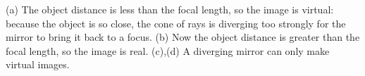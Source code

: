 (a) The object distance is less than the focal length, so the
image is virtual: because the object is so close, the cone of rays
is diverging too strongly for the mirror to bring it back to a focus.
(b) Now the object distance is greater than the focal length, so the image
is real.
(c),(d) A diverging mirror can only make virtual images.



